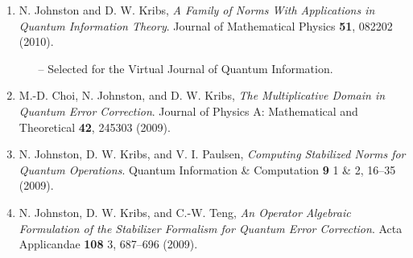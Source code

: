 \documentclass[letterpaper,11pt]{article}
\begin{document}
\begin{enumerate}[1)]
\item
	N. Johnston and D. W. Kribs, {\it A Family of Norms With Applications in Quantum Information Theory}. Journal of Mathematical Physics {\bf 51}, 082202 (2010).
	\vspace{-0.1in}\begin{itemize}
		\item[--] Selected for the Virtual Journal of Quantum Information.
	\end{itemize}

\item
	M.-D. Choi, N. Johnston, and D. W. Kribs, {\it The Multiplicative Domain in Quantum Error Correction}. Journal of Physics A: Mathematical and Theoretical {\bf 42}, 245303 (2009).

\item
	N. Johnston, D. W. Kribs, and V. I. Paulsen, {\it Computing Stabilized Norms for Quantum Operations}. Quantum Information \& Computation {\bf 9} 1 \& 2, 16--35 (2009).

\item
	N. Johnston, D. W. Kribs, and C.-W. Teng, {\it An Operator Algebraic Formulation of the Stabilizer Formalism for Quantum Error Correction}. Acta Applicandae {\bf 108} 3, 687--696 (2009).
\end{enumerate}
\end{document}

